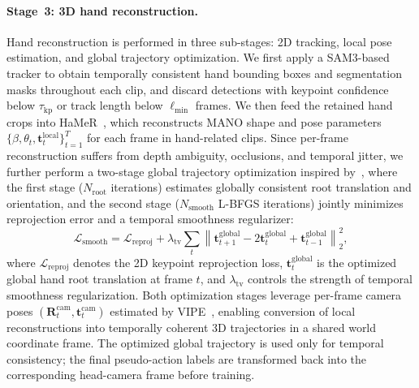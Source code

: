 \paragraph{Stage~3: 3D hand reconstruction.}
Hand reconstruction is performed in three sub-stages: 2D tracking, local pose estimation, and global trajectory optimization. We first apply a SAM3-based~\cite{sam3} tracker to obtain temporally consistent hand bounding boxes and segmentation masks throughout each clip, and discard detections with keypoint confidence below $\tau_{\mathrm{kp}}$ or track length below $\ell_{\min}$ frames. We then feed the retained hand crops into HaMeR~\cite{pavlakos2024reconstructing}, which reconstructs MANO shape and pose parameters $\{\beta, \theta_t, \mathbf{t}^{\mathrm{local}}_t\}_{t=1}^{T}$ for each frame in hand-related clips. Since per-frame reconstruction suffers from depth ambiguity, occlusions, and temporal jitter, we further perform a two-stage global trajectory optimization inspired by~\cite{dyn}, where the first stage ($N_{\mathrm{root}}$ iterations) estimates globally consistent root translation and orientation, and the second stage ($N_{\mathrm{smooth}}$ L-BFGS iterations) jointly minimizes reprojection error and a temporal smoothness regularizer:
\begin{equation}
\mathcal{L}_{\mathrm{smooth}}
=
\mathcal{L}_{\mathrm{reproj}}
+
\lambda_{\mathrm{tv}}
\sum_t
\left\|
\mathbf{t}^{\mathrm{global}}_{t+1}
-
2\mathbf{t}^{\mathrm{global}}_{t}
+
\mathbf{t}^{\mathrm{global}}_{t-1}
\right\|_2^2 ,
\end{equation}
where $\mathcal{L}_{\mathrm{reproj}}$ denotes the 2D keypoint reprojection loss, $\mathbf{t}^{\mathrm{global}}_t$ is the optimized global hand root translation at frame $t$, and $\lambda_{\mathrm{tv}}$ controls the strength of temporal smoothness regularization. Both optimization stages leverage per-frame camera poses $(\mathbf{R}_t^{\mathrm{cam}}, \mathbf{t}_t^{\mathrm{cam}})$ estimated by VIPE~\cite{vipe}, enabling conversion of local reconstructions into temporally coherent 3D trajectories in a shared world coordinate frame. The optimized global trajectory is used only for temporal consistency; the final pseudo-action labels are transformed back into the corresponding head-camera frame before training.

